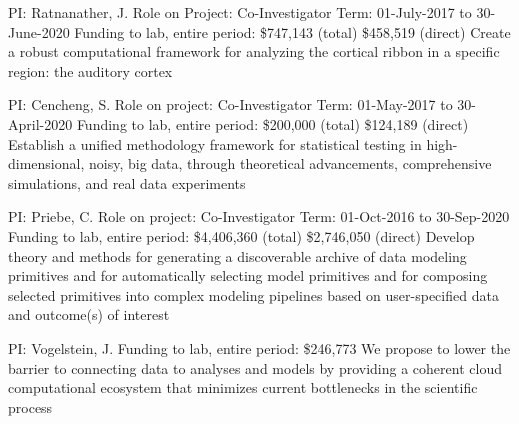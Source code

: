 \documentclass[10pt,colorlinks=true,urlcolor=blue]{moderncv}
\begin{document}
    {\newline PI: Ratnanather, J.
    \newline Role on Project: Co-Investigator
    \newline Term: 01-July-2017 to 30-June-2020
    \newline Funding to lab, entire period: \$747,143 (total) \$458,519 (direct)
    \newline Create a robust computational framework for analyzing the cortical ribbon in a specific
    region: the auditory cortex}{}{}{}
    
    {\newline PI: Cencheng, S.
    \newline Role on project: Co-Investigator
    \newline Term: 01-May-2017 to 30-April-2020
    \newline Funding to lab, entire period: \$200,000 (total) \$124,189 (direct)
    \newline Establish a unified methodology framework for statistical testing in high-dimensional, noisy,
    big data, through theoretical advancements, comprehensive simulations, and real data
    experiments}{}{}{}
    
    {\newline PI: Priebe, C.
    \newline Role on project: Co-Investigator
    \newline Term: 01-Oct-2016 to 30-Sep-2020
    \newline Funding to lab, entire period: \$4,406,360 (total) \$2,746,050 (direct)
    \newline Develop theory and methods for generating a discoverable archive of data modeling
    primitives and for automatically selecting model primitives and for composing selected primitives into complex
    modeling pipelines based on user-specified data and outcome(s) of interest}{}{}{}
    
    {\newline PI: Vogelstein, J.
    \newline Funding to lab, entire period: \$246,773
    \newline We propose to lower the barrier to connecting data to analyses and models by providing a coherent cloud computational ecosystem that minimizes current bottlenecks in the scientific process}{}{}{}
    
\end{document}
